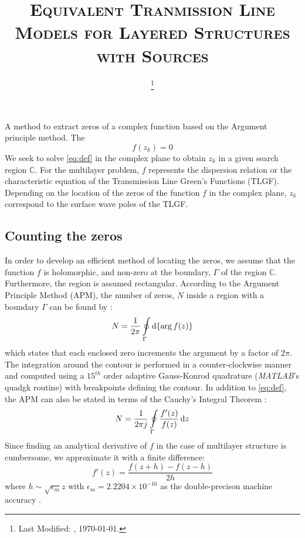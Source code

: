 \documentclass[12pt]{article}
\begin{document}
\title{\textsc{Equivalent Tranmission Line Models for Layered Structures with Sources}\\}
\date{\footnote{Last Modified: \currenttime, \today.}}
\maketitle
%
A method to extract zeros of a complex function based on the Argument principle method. The
%
\begin{equation}
  f(z_k) = 0
  \label{eq:def}
\end{equation}
%
We seek to solve \eqref{eq:def} in the complex plane to obtain $z_k$ in a given search region $\mathbb{C}$. For the multilayer problem, $f$ represents the dispersion relation or the characteristic equation of the Transmission Line Green's Functions (TLGF). Depending on the location of the zeros of the function $f$ in the complex plane, $z_k$ correspond to the surface wave poles of the TLGF.
%
\subsection*{Counting the zeros}
In order to develop an efficient method of locating the zeros, we assume that the function $f$ is holomorphic, and non-zero at the boundary, $\Gamma$ of the region $\mathbb{C}$. Furthermore, the region is assumed rectangular. According to the Argument Principle Method (APM), the number of zeros, $N$ inside a region with a boundary $\Gamma$ can be found by \cite{Carpentier1982c,Gillan2006c}:
%
\begin{equation}
  N = \frac{1}{2 \pi} \oint \limits_{\Gamma} \dif {\{ \arg f(z)\} }
  \label{eq:numzeros}
\end{equation}
%
which states that each enclosed zero increments the argument by a factor of $2 \pi$. The integration around the contour is performed in a counter-clockwise manner and computed using a $15^{th}$ order adaptive Gauss-Konrod quadrature (\emph{MATLAB}'s quadgk routine) with breakpoints defining the contour. In addition to \eqref{eq:def}, the APM can also be stated in terms of the Cauchy's Integral Theorem \cite[pg. 71]{Krantz1999}:
%
\begin{equation}
  N = \frac{1}{2 \pi j} \oint \limits_{\Gamma} \frac{f'(z)}{f(z)} \dif z
  \label{eq:cauchyth}
\end{equation}
%
Since finding an analytical derivative of $f$ in the case of multilayer structure is cumbersome, we approximate it with a finite difference:
%
\begin{equation}
  f'(z) = \frac{f(z + h) - f(z - h)}{2 h}
  \label{eq:FD}
\end{equation}
%
where $h \sim \sqrt{\epsilon_m}z$ with $\epsilon_m = 2.2204 \times 10^{-16}$ as the double-precison machine accuracy \cite[pg. 230]{press2007numerical}.
%
\end{document}
